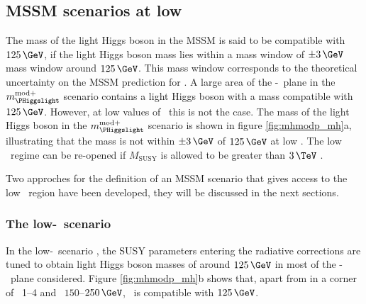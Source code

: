 \subsection{MSSM scenarios at low \tanb}
\label{sec:mssm_theory_lowtb}
The mass of the light Higgs boson in the \ac{MSSM} is said to
be compatible with $125\,\GeV$, if the light Higgs boson mass lies within a 
mass window of $\pm 3\,\GeV$ mass window around $125\,\GeV$. This mass window
corresponds to the theoretical uncertainty on the \ac{MSSM} prediction for \mh.
A large area of the \mA-\tanb~plane in the $m_{\PHiggslight}^{\text{mod+}}$ 
scenario contains a light Higgs boson with a mass compatible with
$125\,\GeV$. However, at low values of \tanb~this is not the case.
The mass of the light Higgs
boson in the $m_{\PHiggslight}^{\text{mod}+}$ scenario is shown in 
figure \ref{fig:mhmodp_mh}a, illustrating that the mass 
is not within $\pm 3\,\GeV$ of $125\,\GeV$ at low \tanb. The low \tanb~regime can be re-opened
if $M_{\text{SUSY}}$ is allowed to be greater than $3\,\TeV$ \cite{MSSM-reopen}. 
%


Two approches for the definition of an \ac{MSSM} scenario that gives
access to the low \tanb~region have been developed, they will be
discussed in the next sections.

\subsubsection{The low-\tanb~scenario}
\label{sec:theory_BSM_model_lowtb}
In the low-\tanb~scenario \cite{Hein-low-tb-high,MSSM-lowtanb}, the SUSY parameters entering
the radiative corrections are tuned to obtain light 
Higgs boson masses of around $125\,\GeV$ in most of the \mA-\tanb~plane considered.
Figure \ref{fig:mhmodp_mh}b shows that, apart from in a corner of \tanb~1--4 and 
\mA~$150$--$250\,\GeV$, \mh~is compatible with $125\,\GeV$.

